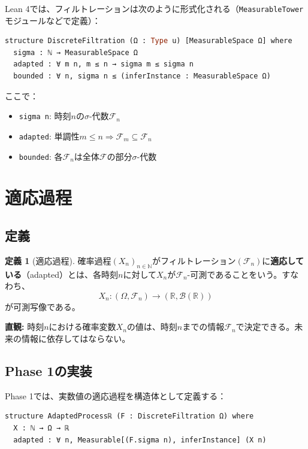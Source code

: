 \documentclass[a4paper,11pt]{ltjsarticle}
\theoremstyle{definition}
\newtheorem{definition}{定義}[section]
\begin{document}
Lean 4では、フィルトレーションは次のように形式化される（\texttt{MeasurableTower}モジュールなどで定義）：

\begin{lstlisting}[style=leanstyle,language=ML,caption={DiscreteFiltrationの構造（概念図）}]
structure DiscreteFiltration (Ω : Type u) [MeasurableSpace Ω] where
  sigma : ℕ → MeasurableSpace Ω
  adapted : ∀ m n, m ≤ n → sigma m ≤ sigma n
  bounded : ∀ n, sigma n ≤ (inferInstance : MeasurableSpace Ω)
\end{lstlisting}

ここで：
\begin{itemize}
  \item \texttt{sigma n}: 時刻$n$の$\sigma$-代数$\mathcal{F}_n$
  \item \texttt{adapted}: 単調性$m \leq n \Rightarrow \mathcal{F}_m \subseteq \mathcal{F}_n$
  \item \texttt{bounded}: 各$\mathcal{F}_n$は全体$\mathcal{F}$の部分$\sigma$-代数
\end{itemize}

\section{適応過程}

\subsection{定義}

\begin{definition}[適応過程]
確率過程$(X_n)_{n \in \mathbb{N}}$がフィルトレーション$(\mathcal{F}_n)$に\textbf{適応している}（adapted）とは、各時刻$n$に対して$X_n$が$\mathcal{F}_n$-可測であることをいう。すなわち、
\[
X_n : (\Omega, \mathcal{F}_n) \to (\mathbb{R}, \mathcal{B}(\mathbb{R}))
\]
が可測写像である。
\end{definition}

\textbf{直観:} 時刻$n$における確率変数$X_n$の値は、時刻$n$までの情報$\mathcal{F}_n$で決定できる。未来の情報に依存してはならない。

\subsection{Phase 1の実装}

Phase 1では、実数値の適応過程を構造体として定義する：

\begin{lstlisting}[style=leanstyle,language=ML,caption={AdaptedProcessℝの定義}]
structure AdaptedProcessℝ (F : DiscreteFiltration Ω) where
  X : ℕ → Ω → ℝ
  adapted : ∀ n, Measurable[(F.sigma n), inferInstance] (X n)
\end{lstlisting}
\end{document}

